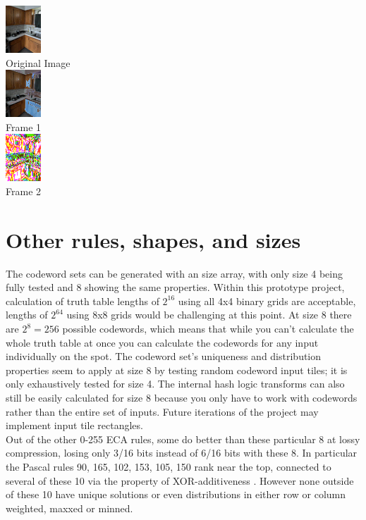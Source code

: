 \documentclass[11pt]{article}
\begin{document}
\begin{center}
\includegraphics{kitchenShrunkresized}\\
Original Image\\
\includegraphics{kitchenShrunkframes0}\\
Frame 1\\
\includegraphics{kitchenShrunkframes1}\\
Frame 2\\
\end{center}

\section{Other rules, shapes, and sizes}

The codeword sets can be generated with an size array, with only size 4 being fully tested and 8 showing the same properties. Within this prototype project, calculation of truth table lengths of $2^{16}$ using all 4x4 binary grids are acceptable, lengths of $2^{64}$ using 8x8 grids would be challenging at this point. At size 8 there are $2^8=256$ possible codewords, which means that while you can't calculate the whole truth table at once you can calculate the codewords for any input individually on the spot. The codeword set's uniqueness and distribution properties seem to apply at size 8 by testing random codeword input tiles; it is only exhaustively tested for size 4. The internal hash logic transforms can also still be easily calculated for size 8 because you only have to work with codewords rather than the entire set of inputs. Future iterations of the project may implement input tile rectangles.\\

Out of the other 0-255 ECA rules, some do better than these particular 8 at lossy compression, losing only 3/16 bits instead of 6/16 bits with these 8. In particular the Pascal rules 90, 165, 102, 153, 105, 150 rank near the top, connected to several of these 10 via the property of XOR-additiveness \cite{xorAdditive}. However none outside of these 10 have unique solutions or even distributions in either row or column weighted, maxxed or minned.\\



\end{document}
